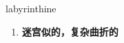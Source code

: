 
\begin{frame}
{\huge labyrinthine}
\begin{center}
\begin{enumerate}\Large
  \item \textbf{迷宫似的，复杂曲折的}
\end{enumerate}
\end{center}
\end{frame}
